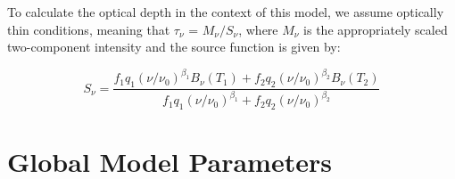\documentclass{emulateapj}
\newcommand{\PLANCK}{{\it Planck}}
\begin{document}




To calculate the optical depth in the context of this model, we assume
optically thin conditions, meaning that $\tau_{\nu}$ = $M_{\nu}/S_{\nu}$, where
$M_{\nu}$ is the appropriately scaled two-component intensity and the source
function is given by:

\begin{equation}
\label{eqn:source}
S_{\nu} = \frac{f_1q_1(\nu/\nu_0)^{\beta_1}B_{\nu}(T_1) + f_2q_2(\nu/\nu_0)^{\beta_2}B_{\nu}(T_2)}{f_1q_1(\nu/\nu_0)^{\beta_1}+f_2q_2(\nu/\nu_0)^{\beta_2}}
\end{equation}

\section{Global Model Parameters}
\label{sec:global}
\end{document}
